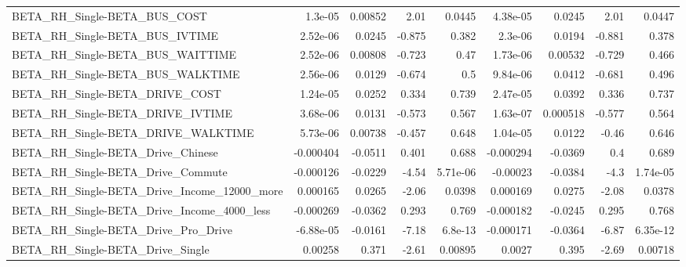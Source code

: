 \begin{tabular}{lrrrrrrrr}
BETA\_RH\_Single-BETA\_BUS\_COST                       &     1.3e-05 &      0.00852 &      2.01 &   0.0445 &   4.38e-05 &      0.0245 &         2.01 &        0.0447 \\
BETA\_RH\_Single-BETA\_BUS\_IVTIME                     &    2.52e-06 &       0.0245 &    -0.875 &    0.382 &    2.3e-06 &      0.0194 &       -0.881 &         0.378 \\
BETA\_RH\_Single-BETA\_BUS\_WAITTIME                   &    2.52e-06 &      0.00808 &    -0.723 &     0.47 &   1.73e-06 &     0.00532 &       -0.729 &         0.466 \\
BETA\_RH\_Single-BETA\_BUS\_WALKTIME                   &    2.56e-06 &       0.0129 &    -0.674 &      0.5 &   9.84e-06 &      0.0412 &       -0.681 &         0.496 \\
BETA\_RH\_Single-BETA\_DRIVE\_COST                     &    1.24e-05 &       0.0252 &     0.334 &    0.739 &   2.47e-05 &      0.0392 &        0.336 &         0.737 \\
BETA\_RH\_Single-BETA\_DRIVE\_IVTIME                   &    3.68e-06 &       0.0131 &    -0.573 &    0.567 &   1.63e-07 &    0.000518 &       -0.577 &         0.564 \\
BETA\_RH\_Single-BETA\_DRIVE\_WALKTIME                 &    5.73e-06 &      0.00738 &    -0.457 &    0.648 &   1.04e-05 &      0.0122 &        -0.46 &         0.646 \\
BETA\_RH\_Single-BETA\_Drive\_Chinese                  &   -0.000404 &      -0.0511 &     0.401 &    0.688 &  -0.000294 &     -0.0369 &          0.4 &         0.689 \\
BETA\_RH\_Single-BETA\_Drive\_Commute                  &   -0.000126 &      -0.0229 &     -4.54 & 5.71e-06 &   -0.00023 &     -0.0384 &         -4.3 &      1.74e-05 \\
BETA\_RH\_Single-BETA\_Drive\_Income\_12000\_more        &    0.000165 &       0.0265 &     -2.06 &   0.0398 &   0.000169 &      0.0275 &        -2.08 &        0.0378 \\
BETA\_RH\_Single-BETA\_Drive\_Income\_4000\_less         &   -0.000269 &      -0.0362 &     0.293 &    0.769 &  -0.000182 &     -0.0245 &        0.295 &         0.768 \\
BETA\_RH\_Single-BETA\_Drive\_Pro\_Drive                &   -6.88e-05 &      -0.0161 &     -7.18 &  6.8e-13 &  -0.000171 &     -0.0364 &        -6.87 &      6.35e-12 \\
BETA\_RH\_Single-BETA\_Drive\_Single                   &     0.00258 &        0.371 &     -2.61 &  0.00895 &     0.0027 &       0.395 &        -2.69 &       0.00718 \\

\end{tabular}
